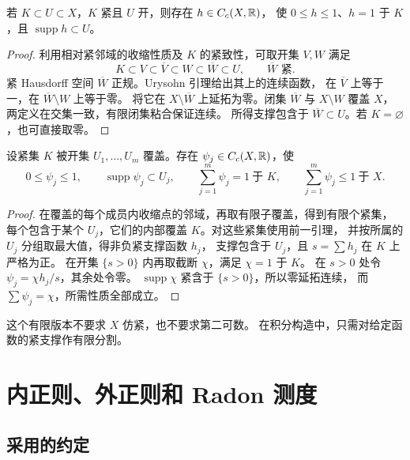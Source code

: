 \begin{lemma}[紧集与开集之间的截断]\label{lem:lch-cutoff}
若 \(K\subset U\subset X\)，\(K\) 紧且 \(U\) 开，则存在 \(h\in C_c(X,\mathbb{R})\)，
使 \(0\le h\le1\)、\(h=1\) 于 \(K\)，且 \(\operatorname{supp}h\subset U\)。
\end{lemma}
\begin{proof}
利用相对紧邻域的收缩性质及 \(K\) 的紧致性，可取开集 \(V,W\) 满足
\[
 K\subset V\subset\overline V\subset W\subset\overline W\subset U,
 \qquad \overline W\text{ 紧}.
\]
紧 Hausdorff 空间 \(\overline W\) 正规。Urysohn 引理给出其上的连续函数，
在 \(\overline V\) 上等于一，在 \(\overline W\setminus W\) 上等于零。
将它在 \(X\setminus\overline W\) 上延拓为零。闭集 \(\overline W\) 与
\(X\setminus W\) 覆盖 \(X\)，两定义在交集一致，有限闭集粘合保证连续。
所得支撑包含于 \(\overline W\subset U\)。若 \(K=\varnothing\)，也可直接取零。
\end{proof}

\begin{lemma}[紧集上的有限单位分解]\label{lem:compact-partition-unity}
设紧集 \(K\) 被开集 \(U_1,\ldots,U_m\) 覆盖。存在
\(\psi_j\in C_c(X,\mathbb{R})\)，使
\[
 0\le\psi_j\le1,\qquad \operatorname{supp}\psi_j\subset U_j,\qquad
 \sum_{j=1}^m\psi_j=1\ \text{于 }K,\qquad \sum_{j=1}^m\psi_j\le1\ \text{于 }X.
\]
\end{lemma}
\begin{proof}
在覆盖的每个成员内收缩点的邻域，再取有限子覆盖，得到有限个紧集，
每个包含于某个 \(U_j\)，它们的内部覆盖 \(K\)。对这些紧集使用前一引理，
并按所属的 \(U_j\) 分组取最大值，得非负紧支撑函数 \(h_j\)，
支撑包含于 \(U_j\)，且 \(s=\sum h_j\) 在 \(K\) 上严格为正。
在开集 \(\{s>0\}\) 内再取截断 \(\chi\)，满足 \(\chi=1\) 于 \(K\)。
在 \(s>0\) 处令 \(\psi_j=\chi h_j/s\)，其余处令零。
\(\operatorname{supp}\chi\) 紧含于 \(\{s>0\}\)，所以零延拓连续，
而 \(\sum\psi_j=\chi\)，所需性质全部成立。
\end{proof}

这个有限版本不要求 \(X\) 仿紧，也不要求第二可数。
在积分构造中，只需对给定函数的紧支撑作有限分割。

\section{内正则、外正则和 Radon 测度}
\label{sec:radon-regularity}

\subsection{采用的约定}

